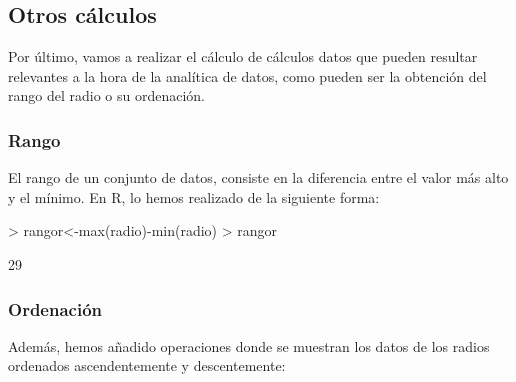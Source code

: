 \documentclass [a4paper] {article}
\begin{document}
\subsection{Otros cálculos}
Por último, vamos a realizar el cálculo de cálculos datos que pueden resultar relevantes a la hora 
de la analítica de datos, como pueden ser la obtención del rango del radio o su ordenación.

\subsubsection{Rango}
El rango de un conjunto de datos, consiste en la diferencia entre el valor más alto y el mínimo.
En R, lo hemos realizado de la siguiente forma:

\begin{Schunk}
\begin{Sinput}
> rangor<-max(radio)-min(radio)
> rangor
\end{Sinput}
\begin{Soutput}
[1] 29
\end{Soutput}
\end{Schunk}

\subsubsection{Ordenación}
Además, hemos añadido operaciones donde se muestran los datos de los radios ordenados ascendentemente y
descentemente:
\end{document}
